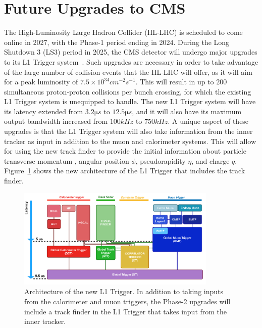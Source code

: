 \section{Future Upgrades to CMS}
\label{sec:CMSUpgrade}

The High-Luminosity Large Hadron Collider (HL-LHC) is scheduled to come online in 2027, with the Phase-1 period ending in 2024.
During the Long Shutdown 3 (LS3) period in 2025, the CMS detector will undergo major upgrades to its L1 Trigger system~\cite{CERN-LHCC-2020-004}.
Such upgrades are necessary in order to take advantage of the large number of collision events that the HL-LHC will offer, as it will aim for a peak luminosity of $7.5\times10^{34}\unit{cm^{-2}s^{-1}}$.
This will result in up to 200 simultaneous proton-proton collisions per bunch crossing, for which the existing L1 Trigger system is unequipped to handle.
The new L1 Trigger system will have its latency extended from $3.2\unit{\micro s}$ to $12.5\unit{\micro s}$, and it will also have its maximum output bandwidth increased from $100\unit{kHz}$ to $750\unit{kHz}$.
A unique aspect of these upgrades is that the L1 Trigger system will also take information from the inner tracker as input in addition to the muon and calorimeter systems.
This will allow for using the new track finder to provide the initial information about particle transverse momentum \pt, angular position $\phi$, pseudorapidity $\eta$, and charge $q$.
Figure~\ref{fig:P2L1trigger} shows the new architecture of the L1 Trigger that includes the track finder.

\begin{figure}[htbp]
  \centering
  \includegraphics[width=0.85\textwidth]{fig/TPS/P2L1trigger.pdf}
  \caption{
    Architecture of the new L1 Trigger.
    In addition to taking inputs from the calorimeter and muon triggers, the Phase-2 upgrades will include a track finder in the L1 Trigger that takes input from the inner tracker.
  }
  \label{fig:P2L1trigger}
\end{figure}

